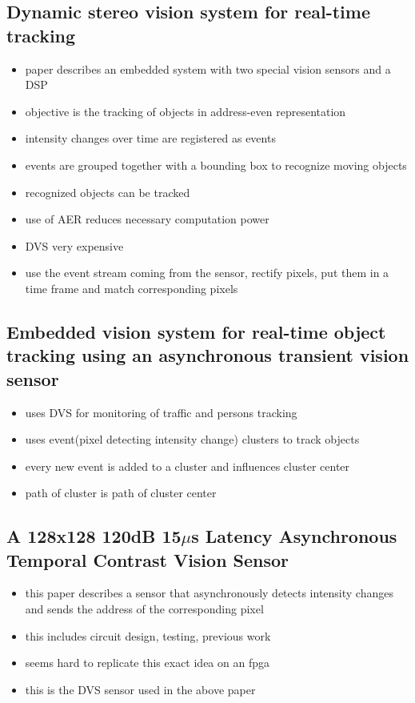 \subsection{Dynamic stereo vision system for real-time tracking} \label{sec:DSV}
\begin{itemize}
\item paper describes an embedded system with two special vision sensors and a DSP
\item objective is the tracking of objects in address-even representation
\item intensity changes over time are registered as events
\item events are grouped together with a bounding box to recognize moving objects
\item recognized objects can be tracked
\item use of AER reduces necessary computation power
\item DVS very expensive
\item use the event stream coming from the sensor, rectify pixels, put them in a time frame and match corresponding pixels
\end{itemize}

\subsection{Embedded vision system for real-time object tracking using an asynchronous transient vision sensor}
\begin{itemize}
\item uses DVS for monitoring of traffic and persons tracking
\item uses event(pixel detecting intensity change) clusters to track objects
\item every new event is added to a cluster and influences cluster center
\item path of cluster is path of cluster center
\end{itemize}

\subsection{A 128x128 120dB 15$\mu$s Latency Asynchronous Temporal Contrast Vision Sensor}
\begin{itemize}
\item this paper describes a sensor that asynchronously detects intensity changes and sends the address of the corresponding pixel
\item this includes circuit design, testing, previous work
\item seems hard to replicate this exact idea on an fpga
\item this is the DVS sensor used in the above paper
\end{itemize}


